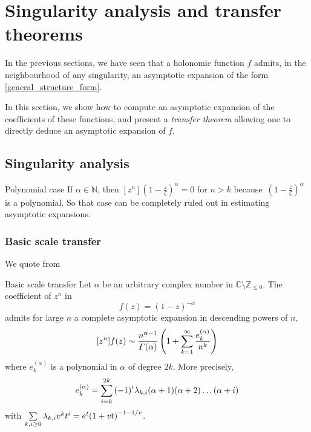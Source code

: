 \documentclass[../main.tex]{subfiles}
\begin{document}
\chapter{Singularity analysis and transfer theorems}

In the previous sections, we have seen that a holonomic function $f$ admits, in the neighbourhood of any singularity, an asymptotic expansion of the form \eqref{general_structure_form}.

In this section, we show how to compute an asymptotic expansion of the coefficients of these functions, and present a \emph{transfer theorem} allowing one to directly deduce an asymptotic expansion of $f$.

\section{Singularity analysis}

\begin{thm}{Polynomial case}
	If $\alpha \in \mathbb{N}$, then $[z^n]{\left(1 - \frac{z}{\zeta}\right)}^\alpha = 0$ for $n > k$
	because~${\left(1 - \frac{z}{\zeta}\right)}^\alpha$ is a polynomial. So that case can be completely ruled out in estimating asymptotic expansions.
\end{thm}


\subsection{Basic scale transfer}

We quote from \cite{Flajolet2009}

\begin{thm}{Basic scale transfer}
	Let $\alpha$ be an arbitrary complex number in
	$\mathbb{C} \setminus \mathbb{Z}_{\leq 0}$.
	The coefficient of $z^n$ in
	\[
	f(z) = {(1 - z)}^{-\alpha}
	\]
	admits for large $n$ a complete asymptotic expansion in descending powers of $n$,
	\[
	[z^n]f(z) \sim \frac{n^{\alpha - 1}}{\Gamma(\alpha)}
	\left(1 + \sum\limits_{k = 1}^{\infty} \frac{e_k^{(\alpha)}}{n^k} \right)
	\]
	where $e_k^{(\alpha)}$ is a polynomial in $\alpha$ of degree $2k$.
	More precisely,
	\[
	e_k^{(\alpha)} = \sum\limits_{i = k}^{2k} {(-1)}^i \lambda_{k, i} (\alpha + 1) (\alpha + 2) \dots (\alpha + i)
	\]
	with $\sum\limits_{k, i \geq 0} \lambda_{k, i} v^k t^i = e^t {(1 + vt)}^{-1 - 1/v}$.
\end{thm}
\end{document}
